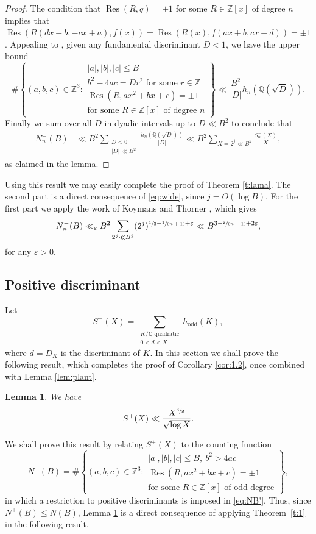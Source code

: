 \documentclass[JEP,XML,SOM,Unicode]{cedram}
\newcommand{\spfrac}[2]{\sfrac{#1}{(#2)}}
\DeclareMathOperator{\Res}{Res}
\newcommand{\QQ}{\mathbb{Q}}\let\Q\QQ
\newcommand{\ZZ}{\mathbb{Z}}\let\Z\ZZ
\let\ve\varepsilon
\newtheorem{lemma}[theorem]{Lemma}
\begin{document}
\begin{proof}
The condition that $\Res(R,q)=\pm 1$ for some $R\in\Z[x]$ of degree $n$ implies that
$\Res(R(dx-b,-cx+a),f(x))=\Res(R(x),f(ax+b,cx+d))=\pm 1$.
Appealing to \cite[Th.\,1.1]{aaron}, given any fundamental discriminant $D<1$, we have the upper bound
\[
\#\left\{(a,b,c)\in \ZZ^3:
\begin{array}{l}
|a|,|b|,|c|\leq B\\
b^2-4ac=Dr^2\text{ for some }r\in\Z\\
\Res(R,ax^2+bx+c)=\pm 1\\
\text{for some $R\in \ZZ[x]$ of degree $n$}
\end{array}
\right\}
\ll \frac{B^{2}}{|D|}h_n(\Q(\sqrt{D})).
\]
Finally we sum over all $D$ in dyadic intervals up to $D\ll B^2$
to conclude that
\begin{align*}
N_n^-(B)
&\ll B^2 \sum_{\substack{D<0\\ |D|\ll B^2}} \frac{h_n(\Q(\sqrt{D}))}{|D|}
\ll B^2 \sum_{X=2^j \ll B^2} \frac{S_n^-(X)}{X},
\end{align*}
as claimed in the lemma.
\end{proof}

Using this result we may easily complete the proof of
Theorem \ref{t:lama}. The second part is a direct consequence of \eqref{eq:wide}, since
$j=O(\log B)$. For the first part we apply the work
of Koymans and Thorner
\cite{koy}, which gives
\[
N_n^-(B)\ll_\ve
B^2 \sum_{2^j \ll B^2}
(2^j)^{\sfrac{1}{2}-\spfrac{1}{n+1}+\ve}\ll B^{3-\spfrac{2}{n+1}+2\ve},
\]
for any $\ve>0$.

\subsection{Positive discriminant}\label{sec:disc2}

Let
\[
S^+(X)=
\sum_{
\substack{K/\QQ \text{ quadratic}\\
0<d<X
}} h_\text{odd}(K),
\]
where $d=D_K$ is the discriminant of $K$.
In this section we shall prove the following result, which completes the proof of Corollary \ref{cor:1.2}, once combined with Lemma \ref{lem:plant}.

\begin{lemma}\label{lem:fish}
We have
\[
S^+(X)\ll \frac{X^{\sfrac{3}{2}}}{\sqrt{\log X}}.
\]
\end{lemma}

We shall prove this result by relating $S^+(X)$ to the counting function
\[
N^+(B)=\#\left\{(a,b,c)\in \ZZ^3:
\begin{array}{l}
|a|,|b|,|c|\leq B, ~b^2>4ac\\
\Res(R,ax^2+bx+c)=\pm 1\\
\text{for some $R\in \ZZ[x]$ of odd degree}
\end{array}
\right\}\!,
\]
in which a restriction to positive discriminants is imposed in
\eqref{eq:NB'}. Thus, since $N^+(B)\leq N(B)$,
Lemma \ref{lem:fish} is a direct consequence of
applying Theorem~\ref{t:1} in
the following result.
\end{document}
